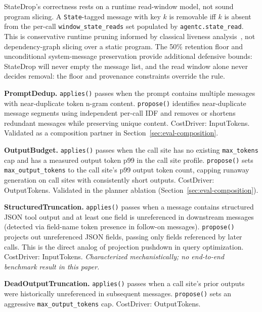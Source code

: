 \documentclass[sigconf,9pt]{acmart}
\begin{document}
StateDrop's correctness rests on a runtime read-window model, not sound program
slicing. A \texttt{State}-tagged message with key $k$ is removable iff $k$ is absent
from the per-call \texttt{window\_state\_reads} set populated by
\texttt{agentc.state\_read}. This is conservative runtime pruning informed by
classical liveness
analysis~\cite{allen1976dataflow,weiser1981slicing,tip1995survey}, not
dependency-graph slicing over a static program. The 50\% retention floor and
unconditional system-message preservation provide additional defensive bounds:
StateDrop will never empty the message list, and the read window alone never decides
removal: the floor and provenance constraints override the rule.

\textbf{PromptDedup.} \texttt{applies()} passes when the prompt contains multiple
messages with near-duplicate token n-gram content. \texttt{propose()} identifies
near-duplicate message segments using independent per-call IDF and removes or shortens
redundant messages while preserving unique content. CostDriver: InputTokens. Validated
as a composition partner in Section~\ref{sec:eval-composition}.

\textbf{OutputBudget.} \texttt{applies()} passes when the call site has no existing
\texttt{max\_tokens} cap and has a measured output token p99 in the call site profile.
\texttt{propose()} sets \texttt{max\_output\_tokens} to the call site's p99 output
token count, capping runaway generation on call sites with consistently short outputs.
CostDriver: OutputTokens. Validated in the planner ablation
(Section~\ref{sec:eval-composition}).

\textbf{StructuredTruncation.} \texttt{applies()} passes when a message contains
structured JSON tool output and at least one field is unreferenced in downstream
messages (detected via field-name token presence in follow-on messages).
\texttt{propose()} projects out unreferenced JSON fields, passing only fields
referenced by later calls. This is the direct analog of projection pushdown in query
optimization. CostDriver: InputTokens. \textit{Characterized mechanistically; no
end-to-end benchmark result in this paper.}

\textbf{DeadOutputTruncation.} \texttt{applies()} passes when a call site's prior
outputs were historically unreferenced in subsequent messages. \texttt{propose()} sets
an aggressive \texttt{max\_output\_tokens} cap. CostDriver: OutputTokens.
\end{document}
